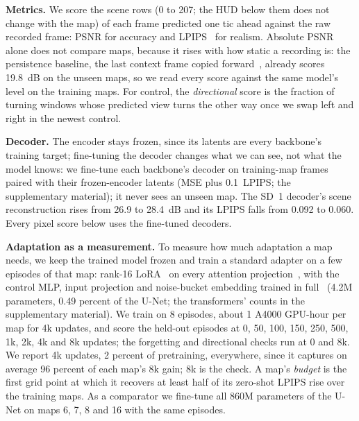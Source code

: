 \documentclass{article}
\newif\ifwithappendix \withappendixfalse %
\newcommand{\appref}[1]{\ifwithappendix Appendix~\ref{#1}\else the supplementary material\fi}
\begin{document}
\textbf{Metrics.} We score the scene rows (0 to 207; the HUD below them does not change with the map) of each frame predicted one tic ahead against the raw recorded frame: PSNR for accuracy and LPIPS~\citep{zhang2018lpips} for realism. Absolute PSNR alone does not compare maps, because it rises with how static a recording is: the persistence baseline, the last context frame copied forward~\citep{mathieu2016deep}, already scores 19.8~dB on the unseen maps, so we read every score against the same model's level on the training maps. For control, the \emph{directional} score is the fraction of turning windows whose predicted view turns the other way once we swap left and right in the newest control.

\textbf{Decoder.} The encoder stays frozen, since its latents are every backbone's training target; fine-tuning the decoder changes what we can see, not what the model knows: we fine-tune each backbone's decoder on training-map frames paired with their frozen-encoder latents (MSE plus 0.1~LPIPS; \appref{app:protocol}); it never sees an unseen map. The SD~1 decoder's scene reconstruction rises from 26.9 to 28.4~dB and its LPIPS falls from 0.092 to 0.060. Every pixel score below uses the fine-tuned decoders.

\textbf{Adaptation as a measurement.} To measure how much adaptation a map needs, we keep the trained model frozen and train a standard adapter on a few episodes of that map: rank-16 LoRA~\citep{hu2022lora} on every attention projection~\citep{gao2024vista}, with the control MLP, input projection and noise-bucket embedding trained in full~\citep{xie2023difffit} (4.2M parameters, 0.49 percent of the U-Net; the transformers' counts in \appref{app:perarena-adapt}). We train on 8 episodes, about 1 A4000 GPU-hour per map for 4k updates, and score the held-out episodes at 0, 50, 100, 150, 250, 500, 1k, 2k, 4k and 8k updates; the forgetting and directional checks run at 0 and 8k. We report 4k updates, 2 percent of pretraining, everywhere, since it captures on average 96 percent of each map's 8k gain; 8k is the check. A map's \emph{budget} is the first grid point at which it recovers at least half of its zero-shot LPIPS rise over the training maps. As a comparator we fine-tune all 860M parameters of the U-Net on maps 6, 7, 8 and 16 with the same episodes.

\begin{table}[t]
\centering\footnotesize

\label{tab:unseen}
{\scriptsize\setlength{\tabcolsep}{2.5pt}}
\end{table}
\end{document}
